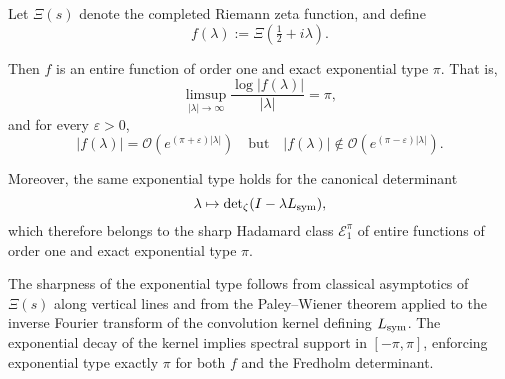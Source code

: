 \begin{lemma}
\label{lem:exact_type_pi}
Let \( \Xi(s) \) denote the completed Riemann zeta function, and define
\[
f(\lambda) := \Xi\left( \tfrac{1}{2} + i\lambda \right).
\]

Then \( f \) is an entire function of order one and exact exponential type \( \pi \). That is,
\[
\limsup_{|\lambda| \to \infty} \frac{\log |f(\lambda)|}{|\lambda|} = \pi,
\]
and for every \( \varepsilon > 0 \),
\[
|f(\lambda)| = \mathcal{O}\left( e^{(\pi + \varepsilon)|\lambda|} \right)
\quad \text{but} \quad
|f(\lambda)| \notin \mathcal{O}\left( e^{(\pi - \varepsilon)|\lambda|} \right).
\]

\medskip
\noindent
Moreover, the same exponential type holds for the canonical determinant
\[
\lambda \mapsto \det\nolimits_\zeta(I - \lambda L_{\mathrm{sym}}),
\]
which therefore belongs to the sharp Hadamard class \( \mathcal{E}_1^\pi \) of entire functions of order one and exact exponential type \( \pi \).

\medskip
\noindent
The sharpness of the exponential type follows from classical asymptotics of \( \Xi(s) \) along vertical lines and from the Paley--Wiener theorem applied to the inverse Fourier transform of the convolution kernel defining \( L_{\mathrm{sym}} \). The exponential decay of the kernel implies spectral support in \( [-\pi, \pi] \), enforcing exponential type exactly \( \pi \) for both \( f \) and the Fredholm determinant.
\end{lemma}
